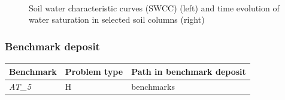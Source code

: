 \begin{figure}[htb!]
\begin{center}
\begin{minipage}[t]{0.45\textwidth}
\begin{center}
      \end{center}
    \end{minipage}\\
  \end{center}
%
  \caption{Soil water characteristic curves (SWCC) (left) and
  time evolution of water saturation in selected soil columns (right)}
  \label{fig:soil_columns}
\end{figure}

\subsubsection*{Benchmark deposit}
\begin{tabular}{|l|l|l|}
  \hline
  Benchmark & Problem type & Path in benchmark deposit \\
  \hline
 \emph{AT\_5} & H & benchmarks\verb \h_us\RSM \\
   \hline
\end{tabular}
